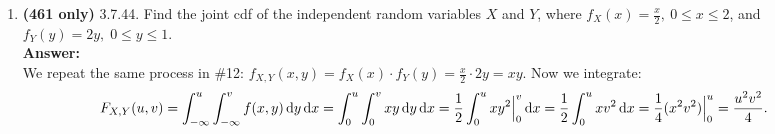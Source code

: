 \documentclass{article}
\begin{document}
\begin{enumerate}
        \item \textbf{(461 only)} 3.7.44. Find the joint cdf of the independent random variables $X$ and $Y$, where $f_X(x) = \frac{x}{2}, \: 0 \leq x \leq 2$, and $f_Y(y) = 2y, \; 0 \leq y \leq 1$.\\
        \textbf{Answer: }\\
        We repeat the same process in \#12: $f_{X,Y}(x,y) = f_X(x) \cdot f_Y(y) = \frac{x}{2} \cdot 2y = xy$. Now we integrate:
            \begin{align*}
                F_{X,Y}(u,v) &= \int_{-\infty}^u\int_{-\infty}^v f(x,y) \dif y \dif x = \int_0^u\int_0^v xy \dif y \dif x = \frac{1}{2}\int_0^u xy^2\Big|_0^v \dif x = \frac{1}{2}\int_0^u xv^2 \dif x = \frac{1}{4}(x^2v^2)\Big|_0^u = \frac{u^2v^2}{4}.
            \end{align*}
    \end{enumerate}
\end{document}
